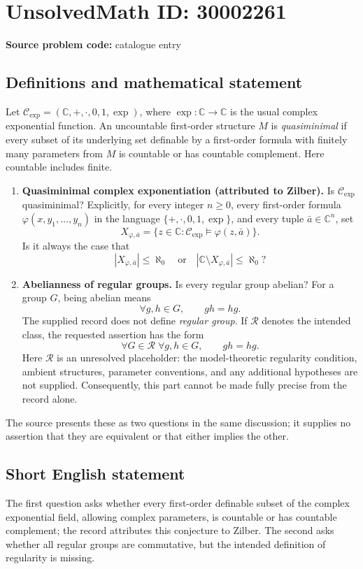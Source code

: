 \documentclass[11pt]{article}
\newcommand{\C}{\mathbb{C}}
\begin{document}
\section*{UnsolvedMath ID: 30002261}
\textbf{Source problem code:} catalogue entry
\subsection{Definitions and mathematical statement}
Let \(\mathcal C_{\exp}=(\C,+,\cdot,0,1,\exp)\), where \(\exp\colon\C\to\C\) is the usual complex exponential function. An uncountable first-order structure \(M\) is \emph{quasiminimal} if every subset of its underlying set definable by a first-order formula with finitely many parameters from \(M\) is countable or has countable complement. Here countable includes finite.

\begin{enumerate}
\item \textbf{Quasiminimal complex exponentiation (attributed to Zilber).} Is \(\mathcal C_{\exp}\) quasiminimal? Explicitly, for every integer \(n\geq 0\), every first-order formula \(\varphi(x,y_1,\ldots,y_n)\) in the language \(\{+,\cdot,0,1,\exp\}\), and every tuple \(\bar a\in\C^n\), set
\[
X_{\varphi,\bar a}=\{z\in\C:\mathcal C_{\exp}\models\varphi(z,\bar a)\}.
\]
Is it always the case that
\[
|X_{\varphi,\bar a}|\leq\aleph_0
\quad\text{or}\quad
|\C\setminus X_{\varphi,\bar a}|\leq\aleph_0?
\]
\item \textbf{Abelianness of regular groups.} Is every regular group abelian? For a group \(G\), being abelian means
\[
\forall g,h\in G,\qquad gh=hg.
\]
The supplied record does not define \emph{regular group}. If \(\mathcal R\) denotes the intended class, the requested assertion has the form
\[
\forall G\in\mathcal R\;\forall g,h\in G,\qquad gh=hg.
\]
Here \(\mathcal R\) is an unresolved placeholder: the model-theoretic regularity condition, ambient structures, parameter conventions, and any additional hypotheses are not supplied. Consequently, this part cannot be made fully precise from the record alone.
\end{enumerate}

The source presents these as two questions in the same discussion; it supplies no assertion that they are equivalent or that either implies the other.
\subsection{Short English statement}
The first question asks whether every first-order definable subset of the complex exponential field, allowing complex parameters, is countable or has countable complement; the record attributes this conjecture to Zilber. The second asks whether all regular groups are commutative, but the intended definition of regularity is missing.
\end{document}
